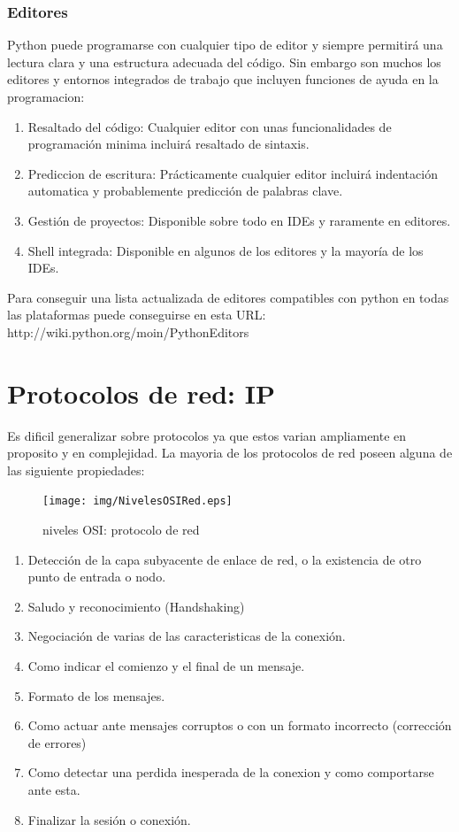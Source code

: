 \documentclass[a4paper,spanish,12pt]{book}
\begin{document}
\subsubsection{Editores}

Python puede programarse con cualquier tipo de editor y siempre permitirá una lectura clara y una estructura adecuada del código. Sin embargo son muchos los editores y entornos integrados de trabajo que incluyen funciones de ayuda en la programacion:
\begin{enumerate}
	\item{Resaltado del código: Cualquier editor con unas funcionalidades de programación minima incluirá resaltado de sintaxis.}
	\item{Prediccion de escritura: Prácticamente cualquier editor incluirá indentación automatica y probablemente predicción de palabras clave.}
	\item{Gestión de proyectos: Disponible sobre todo en IDEs y raramente en editores.}
	\item{Shell integrada: Disponible en algunos de los editores y la mayoría de los IDEs.}
\end{enumerate}

Para conseguir una lista actualizada de editores compatibles con python en todas las plataformas puede conseguirse en esta URL: 
http://wiki.python.org/moin/PythonEditors


\section{Protocolos de red: IP}
Es dificil generalizar sobre protocolos ya que estos varian ampliamente en proposito y en complejidad. La mayoria de los protocolos de red poseen alguna de las siguiente propiedades:

\begin{figure}
	\texttt{[image: img/NivelesOSIRed.eps]}	
              \caption{niveles OSI: protocolo de red}
  \label{fig:nivelesOSIRed}
\end{figure}


\begin{enumerate}
\item Detección de la capa subyacente de enlace de red, o la existencia de otro punto de entrada o nodo.
\item Saludo y reconocimiento (Handshaking)
\item Negociación de varias de las caracteristicas de la conexión.
\item Como indicar el comienzo y el final de un mensaje.
\item Formato de los mensajes.
\item Como actuar ante mensajes corruptos o con un formato incorrecto (corrección de errores)
\item Como detectar una perdida inesperada de la conexion y como comportarse ante esta.
\item Finalizar la sesión o conexión.
\end{enumerate}
\end{document}

